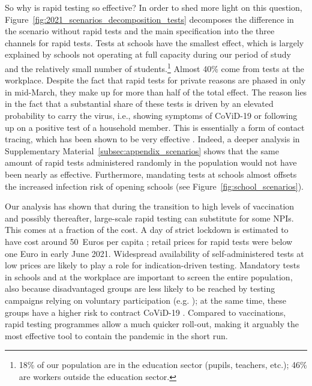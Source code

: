So why is rapid testing so effective? In order to shed more light on this question,
Figure~\ref{fig:2021_scenarios_decomposition_tests} decomposes the difference in the
scenario without rapid tests and the main specification into the three channels for
rapid tests. Tests at schools have the smallest effect, which is largely explained by
schools not operating at full capacity during our period of study and the relatively
small number of students.\footnote{18\% of our population are in the education sector
(pupils, teachers, etc.); 46\% are workers outside the education sector.} Almost 40\%
come from tests at the workplace. Despite the fact that rapid tests for private reasons
are phased in only in mid-March, they make up for more than half of the total effect.
The reason lies in the fact that a substantial share of these tests is driven by an
elevated probability to carry the virus, i.e., showing symptoms of CoViD-19 or following
up on a positive test of a household member. This is essentially a form of contact
tracing, which has been shown to be very effective \cite{Contreras2021,
Fetzer2021,Kretzschmar2020}. Indeed, a deeper analysis in Supplementary
Material~\ref{subsec:appendix_scenarios} shows that the same amount of rapid tests
administered randomly in the population would not have been nearly as effective.
Furthermore, mandating tests at schools almost offsets the increased infection risk of
opening schools (see Figure~\ref{fig:school_scenarios}).

Our analysis has shown that during the transition to high levels of vaccination and
possibly thereafter, large-scale rapid testing can substitute for some NPIs. This comes
at a fraction of the cost. A day of strict lockdown is estimated to have cost around
50~Euros per capita \cite{Dorn2020b}; retail prices for rapid tests were below one Euro
in early June 2021. Widespread availability of self-administered tests at low prices are
likely to play a role for indication-driven testing. Mandatory tests in schools and at
the workplace are important to screen the entire population, also because disadvantaged
groups are less likely to be reached by testing campaigns relying on voluntary
participation (e.g. \cite{StillmanTonin2021}); at the same time, these groups have a
higher risk to contract CoViD-19 \cite{KochInstitut2021a}. Compared to vaccinations,
rapid testing programmes allow a much quicker roll-out, making it arguably the most
effective tool to contain the pandemic in the short run.

